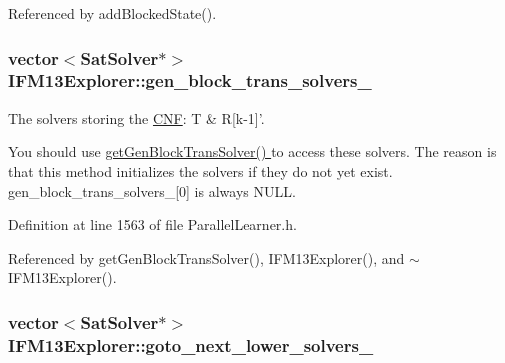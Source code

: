 Referenced by add\-Blocked\-State().

\hypertarget{classIFM13Explorer_a7cec81136159600cb4b65bbb8db0c8a5}{
\subsubsection[{gen\-\_\-block\-\_\-trans\-\_\-solvers\-\_\-}]{\setlength{\rightskip}{0pt plus 5cm}vector$<${\bf Sat\-Solver}$\ast$$>$ I\-F\-M13\-Explorer\-::gen\-\_\-block\-\_\-trans\-\_\-solvers\-\_\-\hspace{0.3cm}{\ttfamily [protected]}}}\label{classIFM13Explorer_a7cec81136159600cb4b65bbb8db0c8a5}


The solvers storing the \hyperlink{classCNF}{C\-N\-F}\-: T \& R\mbox{[}k-\/1\mbox{]}'. 

You should use \hyperlink{classIFM13Explorer_a04ebb206acd0dcf2d02f2e705eaec358}{get\-Gen\-Block\-Trans\-Solver() } to access these solvers. The reason is that this method initializes the solvers if they do not yet exist. gen\-\_\-block\-\_\-trans\-\_\-solvers\-\_\-\mbox{[}0\mbox{]} is always N\-U\-L\-L. 

Definition at line 1563 of file Parallel\-Learner.\-h.



Referenced by get\-Gen\-Block\-Trans\-Solver(), I\-F\-M13\-Explorer(), and $\sim$\-I\-F\-M13\-Explorer().

\hypertarget{classIFM13Explorer_aaa5c23d99524b6a0190212bd7abae6dd}{
\subsubsection[{goto\-\_\-next\-\_\-lower\-\_\-solvers\-\_\-}]{\setlength{\rightskip}{0pt plus 5cm}vector$<${\bf Sat\-Solver}$\ast$$>$ I\-F\-M13\-Explorer\-::goto\-\_\-next\-\_\-lower\-\_\-solvers\-\_\-\hspace{0.3cm}{\ttfamily [protected]}}}\label{classIFM13Explorer_aaa5c23d99524b6a0190212bd7abae6dd}


